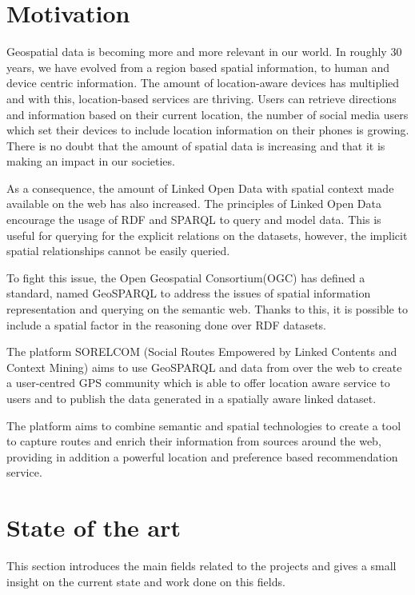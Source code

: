 \section{Motivation}

Geospatial data is becoming more and more relevant in our world. In roughly 30 years, we have evolved from a region based spatial information, to human and device centric information. The amount of location-aware devices has multiplied and with this, location-based services are thriving. Users can retrieve directions and information based on their current location, the number of social media users which set their devices to include location information on their phones is growing. There is no doubt that the amount of spatial data is increasing and that it is making an impact in our societies.

As a consequence, the amount of Linked Open Data with spatial context made available on the web has also increased. The principles of Linked Open Data\cite{linkeddataprinciples} encourage the usage of RDF and SPARQL to query and model data. This is useful for querying for the explicit relations on the datasets, however, the implicit spatial relationships cannot be easily queried.

To fight this issue, the Open Geospatial Consortium(OGC) has defined a standard, named GeoSPARQL to address the issues of spatial information representation and querying on the semantic web. Thanks to this, it is possible to include a spatial factor in the reasoning done over RDF datasets.

The platform SORELCOM (Social Routes Empowered by Linked Contents and Context Mining) aims to use GeoSPARQL and data from over the web to create a user-centred GPS community which is able to offer location aware service to users and to publish the data generated in a spatially aware linked dataset.

The platform aims to combine semantic and spatial technologies to create a tool to capture routes and enrich their information from sources around the web, providing in addition a powerful location and preference based recommendation service.

\section{State of the art}

This section introduces the main fields related to the projects and gives a small insight on the current state and work done on this fields.

